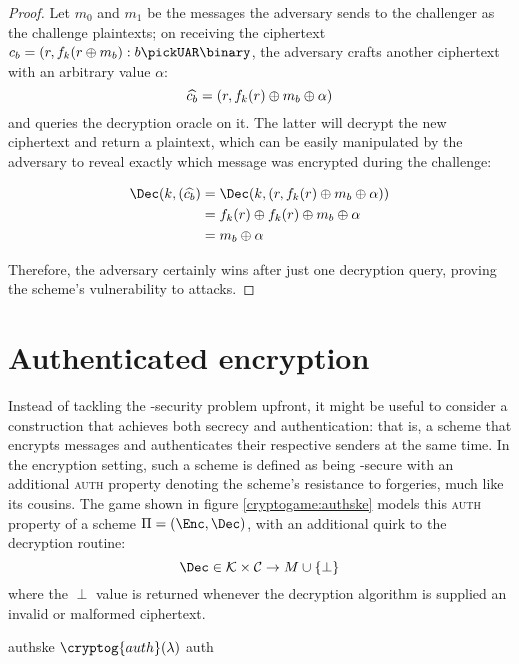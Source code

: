 \begin{proof}

    Let $m_0$ and $m_1$ be the messages the adversary sends to the challenger as the challenge plaintexts; on receiving the ciphertext $c_b = (r, f_k(r \xor m_b) : b \pickUAR \binary$, the adversary crafts another ciphertext with an arbitrary value $\alpha$:
    \[
        \widehat{c_b} = (r, f_k(r) \oplus m_b \oplus \alpha)
    \]
    and queries the decryption oracle on it. The latter will decrypt the new ciphertext and return a plaintext, which can be easily manipulated by the adversary to reveal exactly which message was encrypted during the challenge:

    \begin{align*}
        \Dec(k, (\widehat{c_b}) &= \Dec(k, (r, f_k(r) \xor m_b \xor \alpha))    \\
                                &= f_k(r) \xor f_k(r) \xor m_b \xor \alpha      \\
                                &= m_b \xor \alpha                              \\
    \end{align*}

    Therefore, the adversary certainly wins after just one decryption query, proving the scheme's vulnerability to \cca{} attacks.
   
\end{proof}

\section{Authenticated encryption}

Instead of tackling the \cca-security problem upfront, it might be useful to consider a construction that achieves both secrecy and authentication: that is, a scheme that encrypts messages and authenticates their respective senders at the same time. In the encryption setting, such a scheme is defined as being \cpa-secure with an additional \textsc{auth} property denoting the scheme's resistance to forgeries, much like its \mac{} cousins. The game shown in figure \ref{cryptogame:authske} models this \textsc{auth} property of a scheme $\Pi = (\Enc, \Dec)$, with an additional quirk to the decryption routine:
\[
    \Dec \in \K \times \C \to M \cup \{\perp\}
\]
where the $\perp$ value is returned whenever the decryption algorithm is supplied an invalid or malformed ciphertext.

\begin{cryptogame}
    {authske}
    {$\cryptog{auth}(\lambda)$}
    {auth}


    \cseqbeginloop
    \cseqendloop

    \cseqdelay


\end{cryptogame} 

